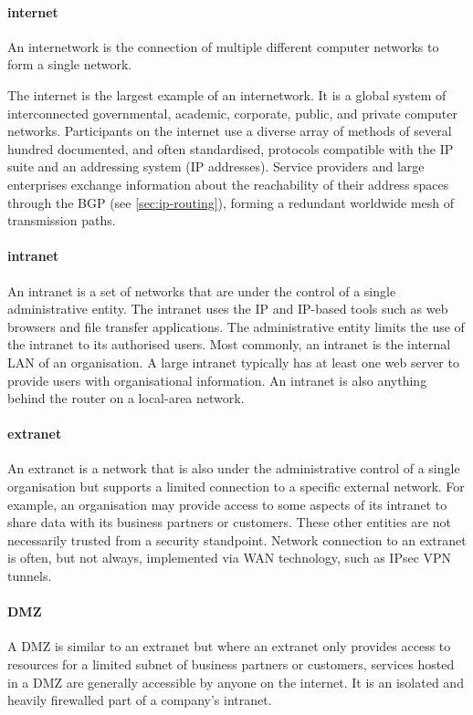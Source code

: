 \paragraph{internet}%
An internetwork is the connection of multiple different computer networks to form a single network.

The internet is the largest example of an internetwork.
It is a global system of interconnected governmental, academic, corporate, public, and private computer networks.
Participants on the internet use a diverse array of methods of several hundred documented, and often standardised, protocols compatible with the \acl{IP} suite and an addressing system (\acs{IP} addresses).
Service providers and large enterprises exchange information about the reachability of their address spaces through the \acf{BGP} (see \vref{sec:ip-routing}), forming a redundant worldwide mesh of transmission paths.

\paragraph{intranet}
An intranet is a set of networks that are under the control of a single administrative entity.
The intranet uses the \gls{IP} and \gls{IP}-based tools such as web browsers and file transfer applications.
The administrative entity limits the use of the intranet to its authorised users.
Most commonly, an intranet is the internal \gls{LAN} of an organisation.
A large intranet typically has at least one web server to provide users with organisational information.
An intranet is also anything behind the router on a local-area network.

\paragraph{extranet}
An extranet is a network that is also under the administrative control of a single organisation but supports a limited connection to a specific external network.
For example, an organisation may provide access to some aspects of its intranet to share data with its business partners or customers.
These other entities are not necessarily trusted from a security standpoint.
Network connection to an extranet is often, but not always, implemented via \gls{WAN} technology, such as IPsec \acs{VPN} tunnels.

\paragraph{\gls{DMZ}}
A \gls{DMZ} is similar to an extranet but where an extranet only provides access to resources for a limited subnet of business partners or customers, services hosted in a \gls{DMZ} are generally accessible by anyone on the internet.
It is an isolated and heavily firewalled part of a company's intranet.


